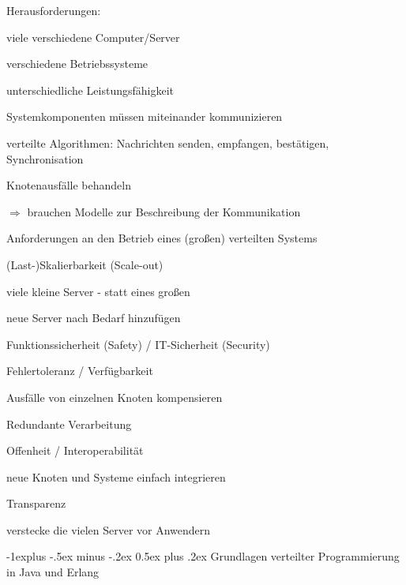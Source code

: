 \documentclass[10pt]{article}
\makeatletter
\renewcommand{\subsection}{\@startsection{subsection}{2}{0mm}%
                                {-1explus -.5ex minus -.2ex}%
                                {0.5ex plus .2ex}%
                                {\normalfont\normalsize\bfseries}}
\makeatother
\begin{document}
\begin{itemize*}
Herausforderungen:
\begin{itemize*}
  \item viele verschiedene Computer/Server
  \begin{itemize*}
    \item verschiedene Betriebssysteme
    \item unterschiedliche Leistungsfähigkeit
  \end{itemize*}
  \item Systemkomponenten müssen miteinander kommunizieren
  \item verteilte Algorithmen: Nachrichten senden, empfangen, bestätigen, Synchronisation
  \item Knotenausfälle behandeln
\end{itemize*}
$\Rightarrow$ brauchen Modelle zur Beschreibung der Kommunikation

Anforderungen an den Betrieb eines (großen) verteilten Systems
\begin{itemize*}
  \item (Last-)Skalierbarkeit (Scale-out)
  \begin{itemize*}
    \item viele kleine Server - statt eines großen
    \item neue Server nach Bedarf hinzufügen
  \end{itemize*}
  \item Funktionssicherheit (Safety) / IT-Sicherheit (Security)
  \item Fehlertoleranz / Verfügbarkeit
  \begin{itemize*}
    \item Ausfälle von einzelnen Knoten kompensieren
    \item Redundante Verarbeitung
  \end{itemize*}
  \item Offenheit / Interoperabilität
  \begin{itemize*}
    \item neue Knoten und Systeme einfach integrieren
  \end{itemize*}
  \item Transparenz
  \begin{itemize*}
    \item verstecke die vielen Server vor Anwendern
  \end{itemize*}
\end{itemize*}


\subsection{Grundlagen verteilter Programmierung in Java und Erlang}

\end{itemize*}
\end{document}
